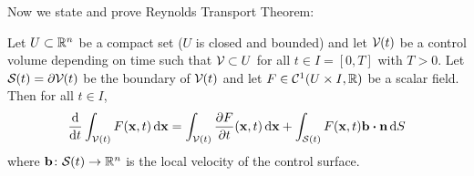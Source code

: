 Now we state and prove Reynolds Transport Theorem:

\begin{theorem}
	Let $U \subset \mathbb{R}^n$ be a compact set (\ie $U$ is closed and bounded) and let $\mathcal{V}_{}(t)$ be a control volume depending on time such that $\mathcal{V}_{} \subset U$ for all $t \in I = [0, T]$ with $T > 0$. Let $\mathcal{S}_{}(t) = \partial \mathcal{V}_{}(t)$ be the boundary of $\mathcal{V}_{}(t)$ and let $F \in \mathcal{C}^1(U \times I, \mathbb{R})$ be a scalar field. Then for all $t \in I$,
	\begin{equation} \label{eq:reynolds_transport_theorem}
		\frac{\dd}{\dd{t}} \int_\cvt F(\vb{x}, t) \dd{\vb{x}} = 
		\int_\cvt \frac{\partial F}{\partial t} (\vb{x}, t) \dd{\vb{x}} + 
		\int_\cst F(\vb{x}, t) \vb{b} \vdot \vb{n} \dd{S}
	\end{equation}
	where $\vb{b} \colon \mathcal{S}_{}(t) \rightarrow \mathbb{R}^n$ is the local velocity of the control surface.
\end{theorem}
